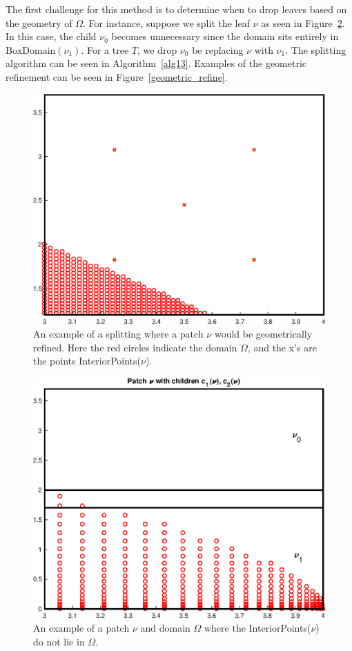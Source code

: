 \documentclass{article}
\begin{document}
The first challenge for this method is to determine when to drop leaves based on the geometry of $\Omega$. For instance, suppose we split the leaf $\nu$ as seen in Figure~\ref{Split_patch_1}. In this case, the child $\nu_0$ becomes unnecessary since the domain sits entirely in $\text{BoxDomain}(\nu_1)$. For a tree $T$, we drop $\nu_0$ be replacing $\nu$ with $\nu_1$. The splitting algorithm can be seen in Algorithm~\ref{alg13}. Examples of the geometric refinement can be seen in Figure~\ref{geometric_refine}.

\begin{figure}[!h]
\centering
\includegraphics[scale = 0.5]{single_patch_cosine.eps}
\caption{An example of a splitting where a patch $\nu$ would be geometrically refined. Here the red circles indicate the domain $\Omega$, and the x's are the points InteriorPoints($\nu$).}
\label{Split_patch_single}
\end{figure}

\begin{figure}[!h]
\centering
\includegraphics[scale = 0.5]{split_patch_cosine.eps}
\caption{An example of a patch $\nu$ and domain $\Omega$ where the InteriorPoints($\nu$) do not lie in $\Omega$.}
\label{Split_patch_1}
\end{figure}
\end{document}
